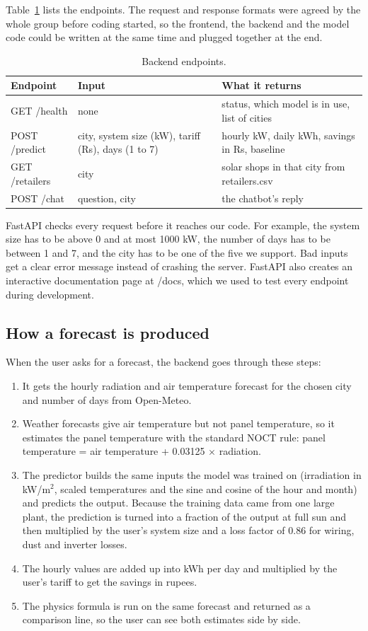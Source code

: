 Table~\ref{tab:endpoints} lists the endpoints. The request and response formats were agreed by the whole group before coding started, so the frontend, the backend and the model code could be written at the same time and plugged together at the end.

\begin{table}[H]
\centering
\begin{tabular}{lll}
\toprule
Endpoint & Input & What it returns \\
\midrule
GET /health & none & status, which model is in use, list of cities \\
POST /predict & city, system size (kW), tariff (Rs), days (1 to 7) & hourly kW, daily kWh, savings in Rs, baseline \\
GET /retailers & city & solar shops in that city from retailers.csv \\
POST /chat & question, city & the chatbot's reply \\
\bottomrule
\end{tabular}
\caption{Backend endpoints.}
\label{tab:endpoints}
\end{table}

FastAPI checks every request before it reaches our code. For example, the system size has to be above 0 and at most 1000 kW, the number of days has to be between 1 and 7, and the city has to be one of the five we support. Bad inputs get a clear error message instead of crashing the server. FastAPI also creates an interactive documentation page at /docs, which we used to test every endpoint during development.

\subsection{How a forecast is produced}

When the user asks for a forecast, the backend goes through these steps:

\begin{enumerate}
    \item It gets the hourly radiation and air temperature forecast for the chosen city and number of days from Open-Meteo.
    \item Weather forecasts give air temperature but not panel temperature, so it estimates the panel temperature with the standard NOCT rule: panel temperature = air temperature + 0.03125 $\times$ radiation.
    \item The predictor builds the same inputs the model was trained on (irradiation in kW/m$^2$, scaled temperatures and the sine and cosine of the hour and month) and predicts the output. Because the training data came from one large plant, the prediction is turned into a fraction of the output at full sun and then multiplied by the user's system size and a loss factor of 0.86 for wiring, dust and inverter losses.
    \item The hourly values are added up into kWh per day and multiplied by the user's tariff to get the savings in rupees.
    \item The physics formula is run on the same forecast and returned as a comparison line, so the user can see both estimates side by side.
\end{enumerate}

